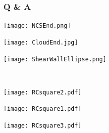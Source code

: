 \documentclass{beamer}
\newcommand{\bm}{\boldsymbol}
\begin{document}
% 


\begin{frame}
\frametitle{Q \& A}
\begin{minipage}{0.3\linewidth}
\begin{center}
\texttt{[image: NCSEnd.png]}  
\end{center}
\end{minipage}
\quad
\begin{minipage}{0.3\linewidth}
\begin{center}
\texttt{[image: CloudEnd.jpg]}  
\end{center}
\end{minipage}
\quad
\begin{minipage}{0.3\linewidth}
\begin{center}
\texttt{[image: ShearWallEllipse.png]}  
\end{center}
\end{minipage}\\
\begin{minipage}{0.3\linewidth}
\texttt{[image: RCsquare2.pdf]} 
\end{minipage}
\quad
\begin{minipage}{0.3\linewidth}
\texttt{[image: RCsquare1.pdf]} 
\end{minipage}
\quad
\begin{minipage}{0.3\linewidth}
\texttt{[image: RCsquare3.pdf]} 
\end{minipage}
\end{frame}
\end{document}
